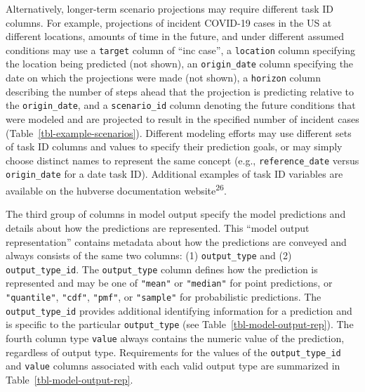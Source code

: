 \documentclass[
  letterpaper,
  DIV=11,
  numbers=noendperiod]{scrartcl}
\begin{document}
Alternatively, longer-term scenario projections may require different
task ID columns. For example, projections of incident COVID-19 cases in
the US at different locations, amounts of time in the future, and under
different assumed conditions may use a \texttt{target} column of ``inc
case'', a \texttt{location} column specifying the location being
predicted (not shown), an \texttt{origin\_date} column specifying the
date on which the projections were made (not shown), a \texttt{horizon}
column describing the number of steps ahead that the projection is
predicting relative to the \texttt{origin\_date}, and a
\texttt{scenario\_id} column denoting the future conditions that were
modeled and are projected to result in the specified number of incident
cases (Table~\ref{tbl-example-scenarios}). Different modeling efforts
may use different sets of task ID columns and values to specify their
prediction goals, or may simply choose distinct names to represent the
same concept (e.g., \texttt{reference\_date} versus
\texttt{origin\_date} for a date task ID). Additional examples of task
ID variables are available on the hubverse documentation
website\textsuperscript{26}.

The third group of columns in model output specify the model predictions
and details about how the predictions are represented. This ``model
output representation'' contains metadata about how the predictions are
conveyed and always consists of the same two columns: (1)
\texttt{output\_type} and (2) \texttt{output\_type\_id}. The
\texttt{output\_type} column defines how the prediction is represented
and may be one of \texttt{"mean"} or \texttt{"median"} for point
predictions, or \texttt{"quantile"}, \texttt{"cdf"}, \texttt{"pmf"}, or
\texttt{"sample"} for probabilistic predictions. The
\texttt{output\_type\_id} provides additional identifying information
for a prediction and is specific to the particular \texttt{output\_type}
(see Table~\ref{tbl-model-output-rep}). The fourth column type
\texttt{value} always contains the numeric value of the prediction,
regardless of output type. Requirements for the values of the
\texttt{output\_type\_id} and \texttt{value} columns associated with
each valid output type are summarized in
Table~\ref{tbl-model-output-rep}.
\end{document}
